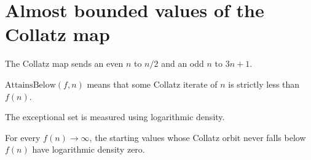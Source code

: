 \section{Almost bounded values of the Collatz map}

\begin{definition}
\label{def:collatz-map}
\leanok
The Collatz map sends an even $n$ to $n/2$ and an odd $n$ to $3n+1$.
\end{definition}

\begin{definition}
\label{def:collatz-below}
\leanok
{}
$\mathrm{AttainsBelow}(f,n)$ means that some Collatz iterate of $n$ is strictly less than $f(n)$.
\end{definition}

\begin{definition}
\label{def:collatz-log-density}
\leanok
The exceptional set is measured using logarithmic density.
\end{definition}

\begin{theorem}
\label{thm:collatz-almost-bounded}
\notready
{}
For every $f(n)\to\infty$, the starting values whose Collatz orbit never falls below $f(n)$ have logarithmic density zero.
\end{theorem}
